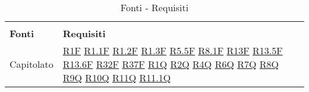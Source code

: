 
\begin{center}
    \centering
    \renewcommand{\arraystretch}{1.8}
    \label{tab:FontiRequisiti}
    \begin{longtable}[!h]{m{50px} m{50px}}
        \rowcolor{white}\caption{Fonti - Requisiti}                                     \\
        \rowcolor{logo!70} \textbf{Fonti} & \textbf{Requisiti}                          \\
        Capitolato                        & \hyperref[tab:RequisitiFunzionali]{R1F}
        \newline \hyperref[tab:RequisitiFunzionali]{R1.1F}
        \newline \hyperref[tab:RequisitiFunzionali]{R1.2F}
        \newline \hyperref[tab:RequisitiFunzionali]{R1.3F}
        \newline \hyperref[tab:RequisitiFunzionali]{R5.5F}
        \newline \hyperref[tab:RequisitiFunzionali]{R8.1F}
        \newline \hyperref[tab:RequisitiFunzionali]{R13F}
        \newline \hyperref[tab:RequisitiFunzionali]{R13.5F}
        \newline \hyperref[tab:RequisitiFunzionali]{R13.6F}
        \newline \hyperref[tab:RequisitiFunzionali]{R32F}
        \newline \hyperref[tab:RequisitiFunzionali]{R37F}
        \newline \hyperref[tab:RequisitiQualita]{R1Q}
        \newline \hyperref[tab:RequisitiQualita]{R2Q}
        \newline \hyperref[tab:RequisitiQualita]{R4Q}
        \newline \hyperref[tab:RequisitiQualita]{R6Q}
        \newline \hyperref[tab:RequisitiQualita]{R7Q}
        \newline \hyperref[tab:RequisitiQualita]{R8Q}
        \newline \hyperref[tab:RequisitiQualita]{R9Q}
        \newline \hyperref[tab:RequisitiQualita]{R10Q}
        \newline \hyperref[tab:RequisitiQualita]{R11Q}
        \newline \hyperref[tab:RequisitiQualita]{R11.1Q}

\end{longtable}
\end{center}
